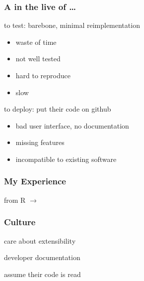 \documentclass{beamer}
\newenvironment{wideitemize}{
    \itemize\addtolength{\itemsep}{15pt}\addtolength{\topsep}{10pt}}{\enditemize}
\begin{document}
    \begin{frame}
        \frametitle{A  in the live of \ldots}
        \vspace{0.8cm}
        \begin{wideitemize}
            \item<2-> to test: barebone, minimal reimplementation
            \begin{itemize}
                \item waste of time
                \item not well tested
                \item hard to reproduce
                \item slow
            \end{itemize}
            \item<3-> to deploy: put their code on github
            \begin{itemize}
                \item bad user interface, no documentation
                \item missing features
                \item incompatible to existing software
            \end{itemize}
        \end{wideitemize}
    \end{frame}

    \begin{frame}
        \frametitle{My Experience}
        \vspace{1cm}
        \begin{wideitemize}
            \item from R $\to$ 
        \end{wideitemize}
    \end{frame}

    \begin{frame}
        \frametitle{Culture}
        \vspace{0.8cm}
        \begin{wideitemize}
            \item care about extensibility
            \item developer documentation
            \item assume their code is read
        \end{wideitemize}
    \end{frame}
\end{document}
